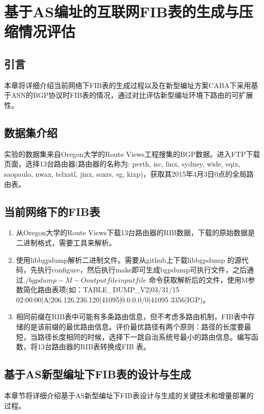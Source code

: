 

\chapter{基于AS编址的互联网FIB表的生成与压缩情况评估}
\label{cha:compression}
\section{引言}
本章将详细介绍当前网络下FIB表的生成过程以及在新型编址方案CABA下采用基于ASN的BGP协议时FIB表的情况，通过对比评估新型编址环境下路由的可扩展性。
\section{数据集介绍}
实验的数据集来自Oregon大学的Route Views工程搜集的BGP数据。进入FTP下载页面，选择13台路由器(路由器的名称为: perth, isc, linx, sydney, wide, eqix, saopaulo, nwax, telxatl, jinx, soxrs, sg, kixp)，获取其2015年4月3日0点的全局路由表。

\section{当前网络下的FIB表}
\label{sect:fibtab}
\begin{enumerate}
\item 从Oregon大学的Route Views下载13台路由器的RIB数据，下载的原始数据是二进制格式，需要工具来解析。
\item 使用libbgpdump解析二进制文件。需要从github上下载libbgpdump 的源代码，先执行configure，然后执行make即可生成bgpdump可执行文件，之后通过$./bgpdump -M -O outputfile inputfile$ 命令获取解析后的文件，使用M参数简化路由表项(如：TABLE\_DUMP\_V2|03/31/15 02:00:00|A|206.126.236.120|41095|0.0.0.0/0|41095 3356|IGP)。
\item 相同前缀在RIB表中可能有多条路由信息，但不考虑多路由机制，FIB表中存储的是该前缀的最优路由信息。评价最优路径有两个原则：路径的长度要最短，当路径长度相同的时候，选择下一跳自治系统号最小的路由信息。编写函数，将13台路由器的RIB表转换成FIB 表。
\end{enumerate}

\section{基于AS新型编址下FIB表的设计与生成}
本章节将详细介绍基于AS新型编址下FIB表设计与生成的关键技术和增量部署的过程。
